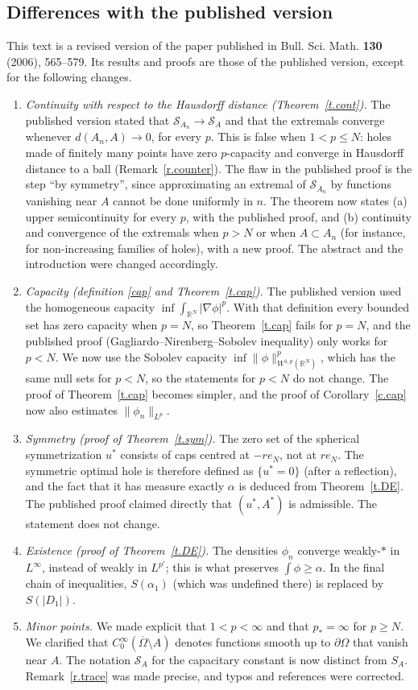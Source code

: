 \documentclass[11pt]{amsart}
\theoremstyle{remark}
\numberwithin{equation}{section}
\newcommand{\R}{\mathbb{R}}
\newcommand{\cS}{\mathcal{S}}
\begin{document}
\subsection*{Differences with the published version}
This text is a revised version of the paper published in Bull. Sci. Math. \textbf{130} (2006), 565--579. Its results and proofs are those of the published version, except for the following changes.
\begin{enumerate}
\item \emph{Continuity with respect to the Hausdorff distance (Theorem~\ref{t.cont}).} The published version stated that $\cS_{A_n}\to\cS_A$ and that the extremals converge whenever $d(A_n,A)\to0$, for every $p$. This is false when $1<p\le N$: holes made of finitely many points have zero $p$-capacity and converge in Hausdorff distance to a ball (Remark~\ref{r.counter}). The flaw in the published proof is the step ``by symmetry'', since approximating an extremal of $\cS_{A_n}$ by functions vanishing near $A$ cannot be done uniformly in $n$. The theorem now states (a) upper semicontinuity for every $p$, with the published proof, and (b) continuity and convergence of the extremals when $p>N$ or when $A\subset A_n$ (for instance, for non-increasing families of holes), with a new proof. The abstract and the introduction were changed accordingly.
\item \emph{Capacity (definition \eqref{cap} and Theorem~\ref{t.cap}).} The published version used the homogeneous capacity $\inf\int_{\R^N}|\nabla\phi|^p$. With that definition every bounded set has zero capacity when $p=N$, so Theorem~\ref{t.cap} fails for $p=N$, and the published proof (Gagliardo--Nirenberg--Sobolev inequality) only works for $p<N$. We now use the Sobolev capacity $\inf\|\phi\|^p_{W^{1,p}(\R^N)}$, which has the same null sets for $p<N$, so the statements for $p<N$ do not change. The proof of Theorem~\ref{t.cap} becomes simpler, and the proof of Corollary~\ref{c.cap} now also estimates $\|\phi_n\|_{L^p}$.
\item \emph{Symmetry (proof of Theorem~\ref{t.sym}).} The zero set of the spherical symmetrization $u^*$ consists of caps centred at $-re_N$, not at $re_N$. The symmetric optimal hole is therefore defined as $\{u^*=0\}$ (after a reflection), and the fact that it has measure exactly $\alpha$ is deduced from Theorem~\ref{t.DE}. The published proof claimed directly that $(u^*,A^*)$ is admissible. The statement does not change.
\item \emph{Existence (proof of Theorem~\ref{t.DE}).} The densities $\phi_n$ converge weakly-$*$ in $L^\infty$, instead of weakly in $L^{p'}$; this is what preserves $\int\phi\ge\alpha$. In the final chain of inequalities, $S(\alpha_1)$ (which was undefined there) is replaced by $S(|D_1|)$.
\item \emph{Minor points.} We made explicit that $1<p<\infty$ and that $p_*=\infty$ for $p\ge N$. We clarified that $C^\infty_0(\overline\Omega\setminus A)$ denotes functions smooth up to $\partial\Omega$ that vanish near $A$. The notation $\cS_A$ for the capacitary constant is now distinct from $S_A$. Remark~\ref{r.trace} was made precise, and typos and references were corrected.
\end{enumerate}
\end{document}

